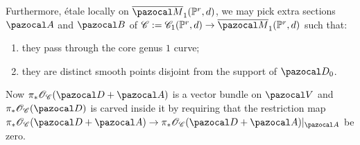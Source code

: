 \documentclass[11pt]{amsart}
\newcommand{\PP}{\mathbb P}
\newcommand{\OO}{\mathcal O}
\renewcommand{\to}{\rightarrow}
\newcommand{\cC}{\mathcal C}
\newcommand{\oM}{\overline{\pazocal M}}
\theoremstyle{plain}
\theoremstyle{definition}
\begin{document}

Furthermore, \'{e}tale locally on $\oM_1(\PP^r,d)$, we may pick extra sections $\pazocal A$ and $\pazocal B$ of $\cC:=\mathcal C_{1}(\PP^r,d)\to\oM_1(\PP^r,d)$ such that:
\begin{enumerate}
\item they pass through the core genus $1$ curve;
\item they are distinct smooth points disjoint from the support of $\pazocal D_0$. 
\end{enumerate}
Now  $\pi_*\OO_{\cC}(\pazocal D+\pazocal A)$ is a vector bundle on $\pazocal V$ and $\pi_*\OO_{\cC}(\pazocal D)$ is carved inside it by requiring that the restriction map $\pi_*\OO_{\cC}(\pazocal D+\pazocal A)\to\pi_*\OO_{\cC}(\pazocal D+\pazocal A)\rvert_{\pazocal A}$ be zero.
\end{document}
